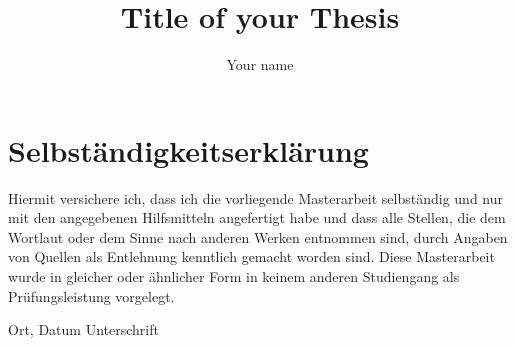 \documentclass{mimosis}
\title{Title of your Thesis}
\author{Your name}
\theoremstyle{definition}
\theoremstyle{remark}
\begin{document}
\frontmatter

  
  \setcounter{page}{1}
  

  \tableofcontents

\mainmatter

  

  
  
  
  
  
  
  

\backmatter
  \printbibliography

  \thispagestyle{empty}
  \chapter*{Selbständigkeitserklärung}

  Hiermit versichere ich, dass ich die vorliegende Masterarbeit selbständig und nur mit den angegebenen Hilfsmitteln angefertigt habe und dass alle Stellen, die dem Wortlaut oder dem Sinne nach anderen Werken entnommen sind, durch Angaben von Quellen als Entlehnung kenntlich gemacht worden sind.
  Diese Masterarbeit wurde in gleicher oder ähnlicher Form in keinem anderen Studiengang als Prüfungsleistung vorgelegt.

  \vskip 3cm

  Ort, Datum	\hfill Unterschrift \hfill
\end{document}
